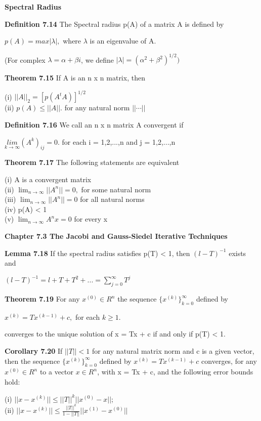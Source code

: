 \documentclass{article}
\begin{document}
\textbf {Spectral Radius}

\textbf {Definition 7.14} The Spectral radius p(A) of a matrix A is defined by
\begin{center}
$p(A) = max |\lambda|,$ where $\lambda$ is an eigenvalue of A.
\end{center}
(For complex $\lambda = \alpha + \beta i$, we define $|\lambda| = (\alpha^2 + \beta^2)^{1/2})$

\textbf {Theorem 7.15} If A is an n x n matrix, then
\begin{center}
(i) $||A||_2 = [p(A^{t}A)]^{1/2}$ \\
(ii) $p(A) \leq ||A||.$ for any natural norm $|| \cdots ||$
\end{center}

\textbf {Definition 7.16} We call an n x n matrix A convergent if 
\begin{center}
$\underset{k \to \infty}{lim} (A^k)_{ij} = 0.$ for each i = 1,2,...,n and j = 1,2,...,n
\end{center}

\textbf {Theorem 7.17} The following statements are equivalent
\begin{center}
(i) A is a convergent matrix \\
(ii) $\lim_{n \to \infty} ||A^n|| = 0,$ for some natural norm \\
(iii) $\lim_{n \to \infty} ||A^n|| = 0$ for all natural norms \\
(iv) p(A) < 1 \\
(v) $\lim_{n \to \infty} A^n x = 0$ for every x \\
\end{center}

\textbf {Chapter 7.3 The Jacobi and Gauss-Siedel Iterative Techniques}

\textbf {Lemma 7.18} If the spectral radius satisfies p(T) < 1, then $(l - T)^{-1}$ exists and
\begin{center}
$(l -T)^{-1} = l + T + T^2 + ... = \sum_{j=0}^{\infty} T^j$
\end{center}

\textbf {Theorem 7.19} For any $x^{(0)} \in R^n$ the sequence $\{x^{(k)} \}_{k=0}^\infty$ defined by
\begin{center}
$x^{(k)} = Tx^{(k-1)} + c,$ for each $k \geq 1.$
\end{center}
converges to the unique solution of x = Tx + c if and only if p(T) < 1.

\textbf {Corollary 7.20} If $||T|| < 1$ for any natural matrix norm and c is a given vector, then the sequence $\{x^{(k)}\}_{k=0}^\infty$ defined by $x^{(k)} = Tx^{(k-1)} + c$ converges, for any $x^{(0)} \in R^n$ to a vector $x \in R^n$, with x = Tx + c, and the following error bounds hold:
\begin{center}
(i) $||x - x^{(k)} || \leq ||T||^k ||x^{(0)} - x||$; \\
(ii) $||x - x^{(k)}|| \leq \frac{||T||^k}{1-||T||} ||x^{(1)} - x^{(0)} ||$
\end{center}
\end{document}
